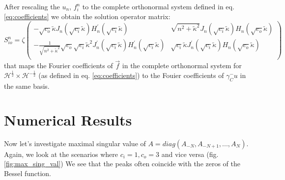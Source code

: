 \documentclass[10pt,journal,compsoc, onecolumn]{IEEEtran}
\begin{document}
After rescaling the $u_n$, $f_i^n$ to the complete orthonormal system defined in eq. \ref{eq:coefficients}
we obtain the solution operator matrix: 
\begin{equation}
    S_{io}^n = 
    \zeta
    \begin{pmatrix}
        -\sqrt{c_o}\tilde \kappa J_n(\sqrt{c_i} \tilde \kappa) H_n^\prime(\sqrt{c_i} \tilde \kappa) & 
        \sqrt{n^2 + \tilde \kappa^2} J_n(\sqrt{c_i} \tilde \kappa) H_n(\sqrt{c_o} \tilde \kappa)  \\
        -\frac{1}{\sqrt{n^2 + \tilde \kappa^2}}\sqrt{c_o}\sqrt{c_i} \tilde \kappa^2 J^\prime_n(\sqrt{c_i} \tilde \kappa) H_n^\prime(\sqrt{c_i} \tilde \kappa) & 
        \sqrt{c_i} \tilde \kappa J^\prime_n(\sqrt{c_i} \tilde \kappa) H_n(\sqrt{c_o} \tilde \kappa) \\
    \end{pmatrix}
\end{equation}
that maps the Fourier coefficients of $\vec{f}$ in the complete orthonormal system for $\mathcal{H}^{\frac{1}{2}}\times \mathcal{H}^{-\frac{1}{2}}$
(as defined in eq. \ref{eq:coefficients}) to the Fouier coefficients of $\gamma_C^-u$ in the same basis.

\section{Numerical Results}
Now let's investigate maximal singular value of $A = diag(A_{-N}, A_{-N + 1}, ..., A_{N})$. 
Again, we look at the scenarios where $c_i = 1, c_o = 3$ and vice versa (fig. \ref{fig:max_sing_val})
We see that the peaks often coincide with the zeros of the Bessel function. 
\end{document}
